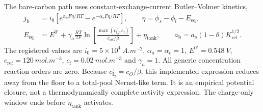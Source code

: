 \documentclass[11pt]{article}
\newcommand{\cf}{c_{\mathrm{I_2}}^{\,\mathrm{f}}}
\begin{document}
The bare-carbon path uses constant-exchange-current Butler--Volmer kinetics,
\begin{equation}
\begin{aligned}
j_{\mathrm b}&=i_0\!\left[e^{\alpha_aF\eta/RT}-e^{-\alpha_cF\eta/RT}\right],\qquad
\eta=\phi_s-\phi_l-E_{\mathrm{eq}},\\
E_{\mathrm{eq}}&=E^{0\prime}+\gamma_a\frac{RT}{2F}\ln\!\left[
\frac{\max(\cf,c_{\mathrm f})}{c_{\mathrm{ref}}/\beta}\right]+\eta_{\mathrm{tank}},\qquad
a_{\mathrm b}=a_s(1-\theta)K_{\mathrm{rel}}^{1/2}.
\end{aligned}
\end{equation}
The registered values are $i_0=5\times10^{4}~\si{A.m^{-2}}$, $\alpha_a=\alpha_c=1$,
$E^{0\prime}=\SI{0.548}{V}$, $c_{\mathrm{ref}}=\SI{120}{mol.m^{-3}}$,
$c_{\mathrm f}=\SI{0.02}{mol.m^{-3}}$ and $\gamma_a=1$. All generic concentration reaction orders are
zero. Because $\cf=c_O/\beta$, this implemented expression reduces away from the floor to a total-pool
Nernst-like term. It is an empirical potential closure, not a thermodynamically complete activity expression.
The charge-only window ends before $\eta_{\mathrm{tank}}$ activates.
\end{document}
